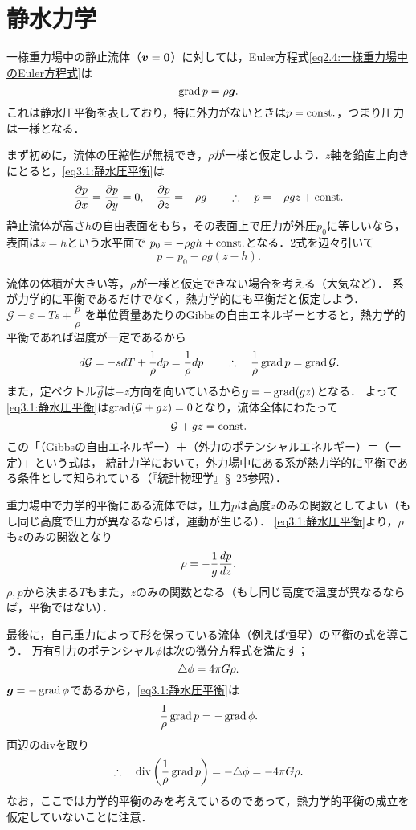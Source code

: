 \section{静水力学}
一様重力場中の静止流体（$\vb*{v}=\vb*{0}$）に対しては，Euler方程式\eqref{eq2.4:一様重力場中のEuler方程式}は
\begin{equation}\label{eq3.1:静水圧平衡}
    \operatorname{grad} p = \rho \vb*{g}.
\end{equation}
これは静水圧平衡を表しており，特に外力がないときは$p=\mathrm{const.}$，つまり圧力は一様となる．

まず初めに，流体の圧縮性が無視でき，$\rho$が一様と仮定しよう．$z$軸を鉛直上向きにとると，\eqref{eq3.1:静水圧平衡}は
\[
    \pdv{p}{x} = \pdv{p}{y} = 0, \quad \pdv{p}{z} = -\rho g
    \qquad\therefore\quad p = -\rho gz + \mathrm{const.}
\]
静止流体が高さ$h$の自由表面をもち，その表面上で圧力が外圧$p_0$に等しいなら，表面は$z=h$という水平面で
$p_0 = -\rho gh + \mathrm{const.}$となる．2式を辺々引いて
\begin{equation}
    p = p_0 -\rho g(z-h).
\end{equation}

流体の体積が大きい等，$\rho$が一様と仮定できない場合を考える（大気など）．
系が力学的に平衡であるだけでなく，熱力学的にも平衡だと仮定しよう．
$ \mathcal{G} = \varepsilon -Ts + \dfrac{p}{\rho}$
を単位質量あたりのGibbsの自由エネルギーとすると，熱力学的平衡であれば温度が一定であるから
\[
    d \mathcal{G} = -sdT + \frac{1}{\rho}dp = \frac{1}{\rho}dp
    \qquad\therefore\quad \frac{1}{\rho}\operatorname{grad} p = \operatorname{grad} \mathcal{G}.
\]
また，定ベクトル$\vec{g}$は$-z$方向を向いているから$\vb*{g} = -\operatorname{grad}(gz)$となる．
よって\eqref{eq3.1:静水圧平衡}は$\operatorname{grad}(\mathcal{G}+gz)=0$となり，流体全体にわたって
\begin{equation}
    \mathcal{G}+gz = \mathrm{const.}
\end{equation}
この「（Gibbsの自由エネルギー）＋（外力のポテンシャルエネルギー）＝（一定）」という式は，
統計力学において，外力場中にある系が熱力学的に平衡である条件として知られている（『統計物理学』\S~25参照）．


重力場中で力学的平衡にある流体では，圧力$p$は高度$z$のみの関数としてよい（もし同じ高度で圧力が異なるならば，運動が生じる）．
\eqref{eq3.1:静水圧平衡}より，$\rho$も$z$のみの関数となり
\begin{equation}\label{eq3.4:1次元の静水圧平衡}
    \rho = - \frac{1}{g} \dv{p}{z}.
\end{equation}
$\rho,p$から決まる$T$もまた，$z$のみの関数となる（もし同じ高度で温度が異なるならば，平衡ではない）．

最後に，自己重力によって形を保っている流体（例えば恒星）の平衡の式を導こう．
万有引力のポテンシャル$\phi$は次の微分方程式を満たす；
\begin{equation}
    \triangle\phi = 4\pi G\rho.
\end{equation}
$\vb*{g} = -\operatorname{grad}\phi$であるから，\eqref{eq3.1:静水圧平衡}は
\[
    \frac{1}{\rho} \operatorname{grad} p = -\operatorname{grad} \phi.
\]
両辺のdivを取り
\begin{equation}\label{eq3.6:自己重力系の静水圧平衡}
    \yueni \Div\pqty{\frac{1}{\rho} \Grad p} = -\Laplacian\phi = -4\pi G\rho.
\end{equation}
なお，ここでは力学的平衡のみを考えているのであって，熱力学的平衡の成立を仮定していないことに注意．

